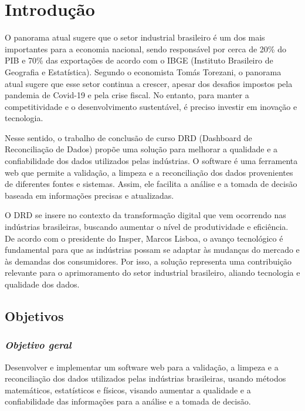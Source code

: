 \chapter{Introdução} \label{Introducao}

O panorama atual sugere que o setor industrial brasileiro é um dos mais importantes para a economia nacional, sendo responsável por cerca de 20\% do PIB e 70\% das exportações de acordo com o IBGE (Instituto Brasileiro de Geografia e Estatística). Segundo o economista Tomás Torezani, o panorama atual sugere que esse setor continua a crescer, apesar dos desafios impostos pela pandemia de Covid-19 e pela crise fiscal. No entanto, para manter a competitividade e o desenvolvimento sustentável, é preciso investir em inovação e tecnologia.

Nesse sentido, o trabalho de conclusão de curso DRD (Dashboard de Reconciliação de Dados) propõe uma solução para melhorar a qualidade e a confiabilidade dos dados utilizados pelas indústrias. O software é uma ferramenta web que permite a validação, a limpeza e a reconciliação dos dados provenientes de diferentes fontes e sistemas. Assim, ele facilita a análise e a tomada de decisão baseada em informações precisas e atualizadas.

O DRD se insere no contexto da transformação digital que vem ocorrendo nas indústrias brasileiras, buscando aumentar o nível de produtividade e eficiência. De acordo com o presidente do Insper, Marcos Lisboa, o avanço tecnológico é fundamental para que as indústrias possam se adaptar às mudanças do mercado e às demandas dos consumidores. Por isso, a solução representa uma contribuição relevante para o aprimoramento do setor industrial brasileiro, aliando tecnologia e qualidade dos dados.

\section{Objetivos}

\subsection{\textit{Objetivo geral}}

Desenvolver e implementar um software web para a validação, a limpeza e a reconciliação dos dados utilizados pelas indústrias brasileiras, usando métodos matemáticos, estatísticos e físicos, visando aumentar a qualidade e a confiabilidade das informações para a análise e a tomada de decisão.

